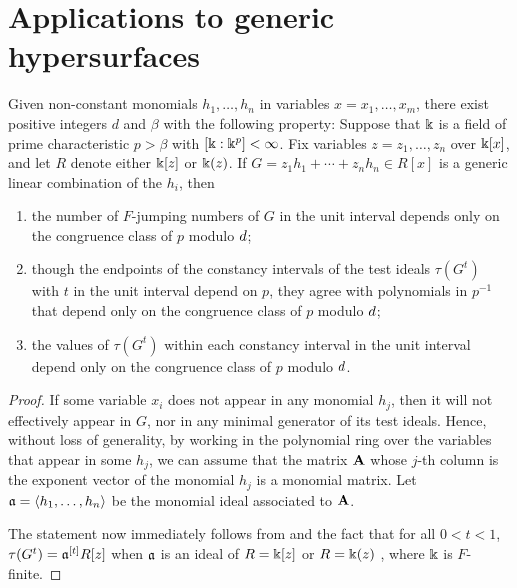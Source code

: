 \documentclass{article}
\begin{document}
\section{Applications to generic hypersurfaces}
\label{generic-hypersurfaces: S}


\begin{theorem}
	\label{generic-test-ideals-main: T}
Given non-constant monomials $h_1, \ldots, h_n$ in variables $x = x_1, \ldots, x_m$, there exist positive integers $d$ and $\beta$ with the following property\textup:  
Suppose that $\Bbbk$ is a field of prime characteristic $p > \beta$ with $[\Bbbk:\Bbbk^p] < \infty$.  
Fix variables $z = z_1, \ldots, z_n$ over $\Bbbk[x]$, and let $R$ denote either $\Bbbk[z]$ or $\Bbbk(z)$. 
If $G = z_1 h_1 + \cdots + z_n h_n \in R[x]$ is a generic linear combination of the $h_i$, then
\begin{enumerate}[$(1)$]
		\item the number of $F$-jumping numbers of $G$ in the unit interval depends only on the congruence class of $p$ modulo $d$\textup;
		\item though the endpoints of the constancy intervals of the test ideals $\tau(G^t)$ with $t$ in the unit interval 
		depend on $p$, they agree with polynomials in $p^{-1}$ that depend only on the congruence class of $p$ modulo $d$\textup;
		\item the values of $\tau(G^t)$ within each constancy interval in the unit interval depend only on the congruence class of $p$ modulo $d$.
	\end{enumerate}	
\end{theorem}

\begin{proof}
If some variable $x_i$ does not appear in any monomial $h_j$, then it will not effectively appear in $G$, nor in  any minimal generator of its test ideals.  
Hence, without loss of generality, by working in the polynomial ring over the variables that appear in some $h_j$, we can assume that the matrix $\mathbf{A}$ whose $j$-th column is the exponent vector of the monomial $h_j$ 
is a monomial matrix.  Let $\mathfrak{a} = \langle h_1, \ldots, h_n \rangle$ be the monomial ideal associated to $\mathbf{A}$.

The statement now immediately follows from   and 
the fact that for all $0 < t < 1$, $\tau(G^t) = \mathfrak{a}^{[t]} R[z]$ when $\mathfrak{a}$ is an ideal of 
$R = \Bbbk[z]$
\cite[Theorem 5.3]{hernandez+etal.frobenius_powers} or $R = \Bbbk(z)$ \cite[Corollary 5.7]{hernandez+etal.frobenius_powers}, where $\Bbbk$ is $F$-finite. 
\end{proof}	
	

\newpage

{\small


}
\end{document}

